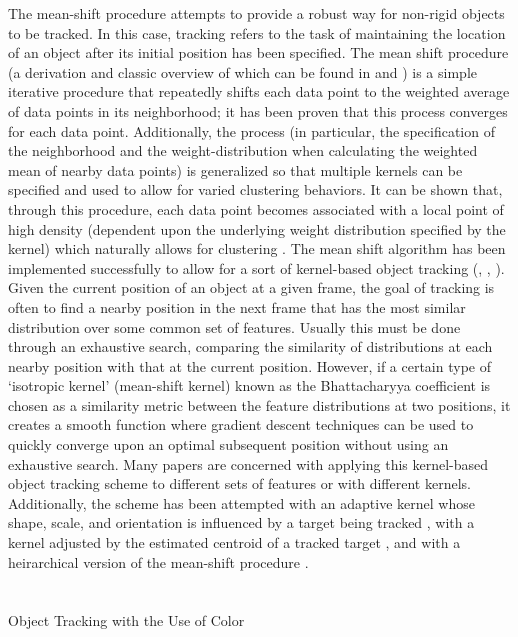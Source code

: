 \documentclass{article}
\begin{document}
The mean-shift procedure attempts to provide a robust way for non-rigid objects to be tracked. In this case, tracking refers to the task of maintaining the location of an object after its initial position has been specified. The mean shift procedure (a derivation and classic overview of which can be found in \cite{fukunaga_1975}and \cite{cheng_1995}) is a simple iterative procedure that repeatedly shifts each data point to the weighted average of data points in its neighborhood; it has been proven that this process converges for each data point. Additionally, the process (in particular, the specification of the neighborhood and the weight-distribution when calculating the weighted mean of nearby data points) is generalized so that multiple kernels can be specified and used to allow for varied clustering behaviors. It can be shown that, through this procedure, each data point becomes associated with a local point of high density (dependent upon the underlying weight distribution specified by the kernel) which naturally allows for clustering \cite{cheng_1995}. The mean shift algorithm has been implemented successfully to allow for a sort of kernel-based object tracking (\cite{comaniciu_2003}, \cite{comaniciu_1999}, \cite{comaniciu_2000}). Given the current position of an object at a given frame, the goal of tracking is often to find a nearby position in the next frame that has the most similar distribution over some common set of features. Usually this must be done through an exhaustive search, comparing the similarity of distributions at each nearby position with that at the current position. However, if a certain type of `isotropic kernel' (mean-shift kernel) known as the Bhattacharyya coefficient is chosen as a similarity metric between the feature distributions at two positions, it creates a smooth function where gradient descent techniques can be used to quickly converge upon an optimal subsequent position without using an exhaustive search. Many papers are concerned with applying this kernel-based object tracking scheme to different sets of features or with different kernels. Additionally, the scheme has been attempted with an adaptive kernel whose shape, scale, and orientation is influenced by a target being tracked \cite{wang_2004}, with a kernel adjusted by the estimated centroid of a tracked target \cite{mehmood_2009}, and with a heirarchical version of the mean-shift procedure \cite{dementhon_2002}. \\
\\
\\
Object Tracking with the Use of Color \\
\end{document}
